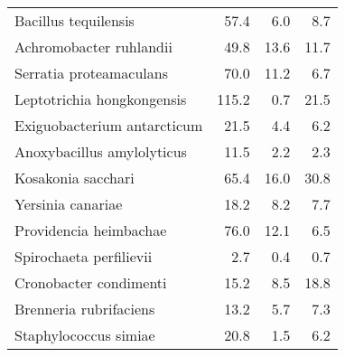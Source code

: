 \begin{table}[]
\begin{tabular}{lrrr}
Bacillus tequilensis              &                   57.4 &                  6.0 &                   8.7 \\
Achromobacter ruhlandii           &                   49.8 &                 13.6 &                  11.7 \\
Serratia proteamaculans           &                   70.0 &                 11.2 &                   6.7 \\
Leptotrichia hongkongensis        &                  115.2 &                  0.7 &                  21.5 \\
Exiguobacterium antarcticum       &                   21.5 &                  4.4 &                   6.2 \\
Anoxybacillus amylolyticus        &                   11.5 &                  2.2 &                   2.3 \\
Kosakonia sacchari                &                   65.4 &                 16.0 &                  30.8 \\
Yersinia canariae                 &                   18.2 &                  8.2 &                   7.7 \\
Providencia heimbachae            &                   76.0 &                 12.1 &                   6.5 \\
Spirochaeta perfilievii           &                    2.7 &                  0.4 &                   0.7 \\
Cronobacter condimenti            &                   15.2 &                  8.5 &                  18.8 \\
Brenneria rubrifaciens            &                   13.2 &                  5.7 &                   7.3 \\
Staphylococcus simiae             &                   20.8 &                  1.5 &                   6.2 \\
\bottomrule
\end{tabular}
\end{table}